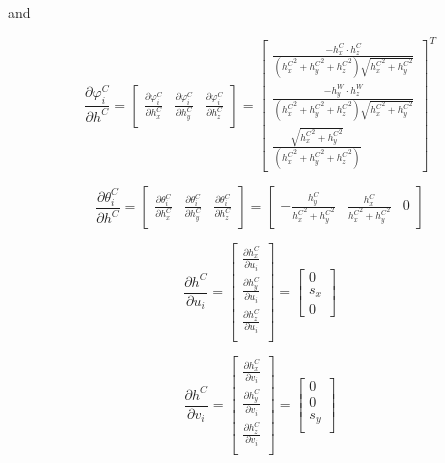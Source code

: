 \noindent and

\begin{equation}
\frac{\partial \varphi_{i}^{C}}{\partial h^{C}}= 
\begin{bmatrix}
\frac{\partial \varphi_{i}^{C}}{\partial h_{x}^{C}} & 
\frac{\partial \varphi_{i}^{C}}{\partial h_{y}^{C}} & 
\frac{\partial \varphi_{i}^{C}}{\partial h_{z}^{C}}
\end{bmatrix}=\begin{bmatrix}
\frac{-h_{x}^{C}\cdot h_{z}^{C}}{({h_{x}^{C}}^{2}+{h_{y}^{C}}^{2}+{h_{z}^{C}}^{2})\sqrt{{h_{x}^{C}}^{2}+{h_{y}^{C}}^{2}}} \\
\frac{-h_{y}^{W}\cdot h_{z}^{W}}{({h_{x}^{C}}^{2}+{h_{y}^{C}}^{2}+{h_{z}^{C}}^{2})\sqrt{{h_{x}^{C}}^{2}+{h_{y}^{C}}^{2}}} \\
\frac{\sqrt{{h_{x}^{C}}^{2}+{h_{y}^{C}}^{2}}}{({h_{x}^{C}}^{2}+{h_{y}^{C}}^{2}+{h_{z}^{C}}^{2})}
\end{bmatrix}^{T}
\end{equation}

\begin{equation}
\frac{\partial \theta_{i}^{C}}{\partial h^{C}}=\begin{bmatrix}
\frac{\partial \theta_{i}^{C}}{\partial h_{x}^{C}} & 
\frac{\partial \theta_{i}^{C}}{\partial h_{y}^{C}} & 
\frac{\partial \theta_{i}^{C}}{\partial h_{z}^{C}} \end{bmatrix}
=\begin{bmatrix}
-\frac{h_{y}^{C}}{{h_{x}^{C}}^{2}+{h_{y}^{C}}^{2}} & 
\frac{h_{x}^{C}}{{h_{x}^{C}}^{2}+{h_{y}^{C}}^{2}} & 0
\end{bmatrix}
\end{equation}

\begin{equation}
\frac{\partial h^{C}}{\partial u_{i}}=\begin{bmatrix}
\frac{\partial h_{x}^{C}}{\partial u_{i}} \\
\frac{\partial h_{y}^{C}}{\partial u_{i}} \\
\frac{\partial h_{z}^{C}}{\partial u_{i}} \\
\end{bmatrix}= \begin{bmatrix}
0 \\
s_{x}\\
0
\end{bmatrix}
\end{equation}

\begin{equation}
\frac{\partial h^{C}}{\partial v_{i}}=\begin{bmatrix}
\frac{\partial h_{x}^{C}}{\partial v_{i}}\\
\frac{\partial h_{y}^{C}}{\partial v_{i}}\\
\frac{\partial h_{z}^{C}}{\partial v_{i}}\\
\end{bmatrix}= \begin{bmatrix}
0 \\
0 \\
s_{y}\\
\end{bmatrix}
\end{equation}

